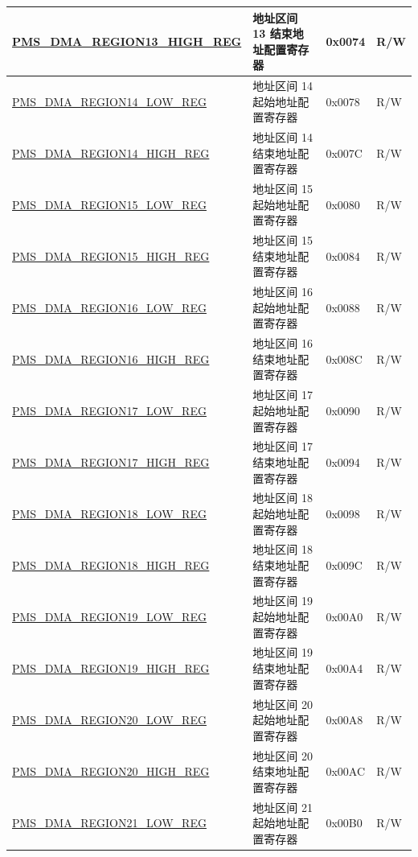\begin{longtable}{ | L{7.5cm} | L{6cm} | L{1.3cm} | L{1cm} | }
\hyperref[regdesc:PMSDMAREGIONNHIGHREG]{PMS\_DMA\_REGION13\_HIGH\_REG} & 地址区间 13 结束地址配置寄存器 & 0x0074 & R/W \\ \hline
\hyperref[regdesc:PMSDMAREGIONNLOWREG]{PMS\_DMA\_REGION14\_LOW\_REG} & 地址区间 14 起始地址配置寄存器 & 0x0078 & R/W \\ \hline
\hyperref[regdesc:PMSDMAREGIONNHIGHREG]{PMS\_DMA\_REGION14\_HIGH\_REG} & 地址区间 14 结束地址配置寄存器 & 0x007C & R/W \\ \hline
\hyperref[regdesc:PMSDMAREGIONNLOWREG]{PMS\_DMA\_REGION15\_LOW\_REG} & 地址区间 15 起始地址配置寄存器 & 0x0080 & R/W \\ \hline
\hyperref[regdesc:PMSDMAREGIONNHIGHREG]{PMS\_DMA\_REGION15\_HIGH\_REG} & 地址区间 15 结束地址配置寄存器 & 0x0084 & R/W \\ \hline
\hyperref[regdesc:PMSDMAREGIONNLOWREG]{PMS\_DMA\_REGION16\_LOW\_REG} & 地址区间 16 起始地址配置寄存器 & 0x0088 & R/W \\ \hline
\hyperref[regdesc:PMSDMAREGIONNHIGHREG]{PMS\_DMA\_REGION16\_HIGH\_REG} & 地址区间 16 结束地址配置寄存器 & 0x008C & R/W \\ \hline
\hyperref[regdesc:PMSDMAREGIONNLOWREG]{PMS\_DMA\_REGION17\_LOW\_REG} & 地址区间 17 起始地址配置寄存器 & 0x0090 & R/W \\ \hline
\hyperref[regdesc:PMSDMAREGIONNHIGHREG]{PMS\_DMA\_REGION17\_HIGH\_REG} & 地址区间 17 结束地址配置寄存器 & 0x0094 & R/W \\ \hline
\hyperref[regdesc:PMSDMAREGIONNLOWREG]{PMS\_DMA\_REGION18\_LOW\_REG} & 地址区间 18 起始地址配置寄存器 & 0x0098 & R/W \\ \hline
\hyperref[regdesc:PMSDMAREGIONNHIGHREG]{PMS\_DMA\_REGION18\_HIGH\_REG} & 地址区间 18 结束地址配置寄存器 & 0x009C & R/W \\ \hline
\hyperref[regdesc:PMSDMAREGIONNLOWREG]{PMS\_DMA\_REGION19\_LOW\_REG} & 地址区间 19 起始地址配置寄存器 & 0x00A0 & R/W \\ \hline
\hyperref[regdesc:PMSDMAREGIONNHIGHREG]{PMS\_DMA\_REGION19\_HIGH\_REG} & 地址区间 19 结束地址配置寄存器 & 0x00A4 & R/W \\ \hline
\hyperref[regdesc:PMSDMAREGIONNLOWREG]{PMS\_DMA\_REGION20\_LOW\_REG} & 地址区间 20 起始地址配置寄存器 & 0x00A8 & R/W \\ \hline
\hyperref[regdesc:PMSDMAREGIONNHIGHREG]{PMS\_DMA\_REGION20\_HIGH\_REG} & 地址区间 20 结束地址配置寄存器 & 0x00AC & R/W \\ \hline
\hyperref[regdesc:PMSDMAREGIONNLOWREG]{PMS\_DMA\_REGION21\_LOW\_REG} & 地址区间 21 起始地址配置寄存器 & 0x00B0 & R/W \\ \hline

\end{longtable}
